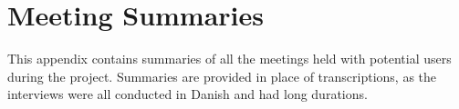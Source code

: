 \chapter{Meeting Summaries}\label{ch:appendix}
This appendix contains summaries of all the meetings held with potential users during the project. Summaries are provided in place of transcriptions, as the interviews were all conducted in Danish and had long durations.







